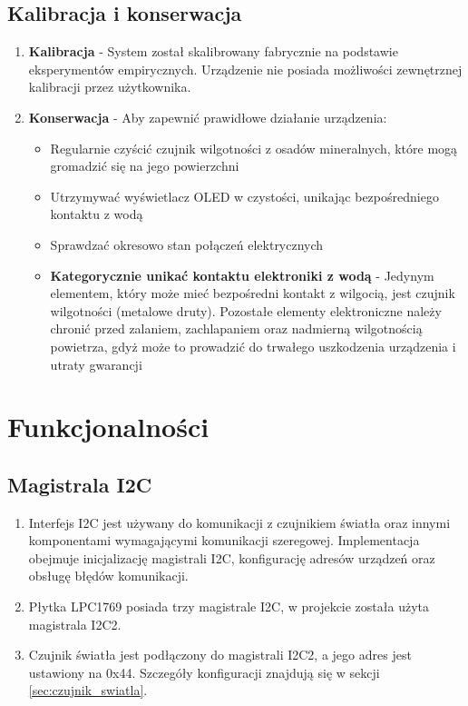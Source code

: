 \documentclass{article}
\begin{document}
\subsection{Kalibracja i konserwacja}
\begin{enumerate}
    \item \textbf{Kalibracja} - System został skalibrowany fabrycznie na podstawie eksperymentów empirycznych. Urządzenie nie posiada możliwości zewnętrznej kalibracji przez użytkownika.
    
    \item \textbf{Konserwacja} - Aby zapewnić prawidłowe działanie urządzenia:
    \begin{itemize}
        \item Regularnie czyścić czujnik wilgotności z osadów mineralnych, które mogą gromadzić się na jego powierzchni
        \item Utrzymywać wyświetlacz OLED w czystości, unikając bezpośredniego kontaktu z wodą
        \item Sprawdzać okresowo stan połączeń elektrycznych
        \item \textbf{Kategorycznie unikać kontaktu elektroniki z wodą} - Jedynym elementem, który może mieć bezpośredni kontakt z wilgocią, jest czujnik wilgotności (metalowe druty). Pozostałe elementy elektroniczne należy chronić przed zalaniem, zachlapaniem oraz nadmierną wilgotnością powietrza, gdyż może to prowadzić do trwałego uszkodzenia urządzenia i utraty gwarancji
    \end{itemize}
\end{enumerate}

\section{Funkcjonalności}

\subsection{Magistrala I2C}
\begin{enumerate}
    \item Interfejs I2C jest używany do komunikacji z czujnikiem światła oraz innymi komponentami wymagającymi komunikacji szeregowej. Implementacja obejmuje inicjalizację magistrali I2C, konfigurację adresów urządzeń oraz obsługę błędów komunikacji.
    \item Płytka LPC1769 posiada trzy magistrale I2C, w projekcie została użyta magistrala I2C2. 
    \item Czujnik światła jest podłączony do magistrali I2C2, a jego adres jest ustawiony na 0x44. Szczegóły konfiguracji znajdują się w sekcji \ref{sec:czujnik_swiatla}.
\end{enumerate}
\end{document}

